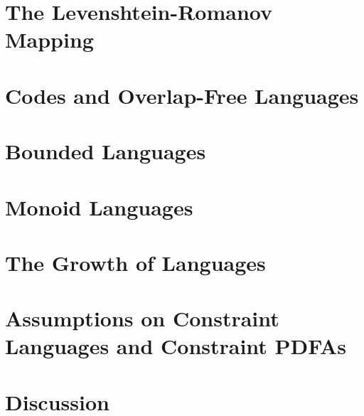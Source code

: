 

\section{The Levenshtein-Romanov Mapping}
\label{constr_sync:subsec:levenshtein-romanov-map}



\section{Codes and Overlap-Free Languages}
\label{constr_sync:subsec:codes}




\section{Bounded Languages}
\label{constr_sync:sec:bounded} 



\section{Monoid Languages}
\label{constr_sync:subsec:monoid}



\section{The Growth of Languages}
\label{constr_sync:sec:growth} 



\section{Assumptions on Constraint Languages and Constraint PDFAs}
\label{constr_sync:sec:assumptions}
 


\section{Discussion}
\label{constrsync:notions:sec:discussion}


